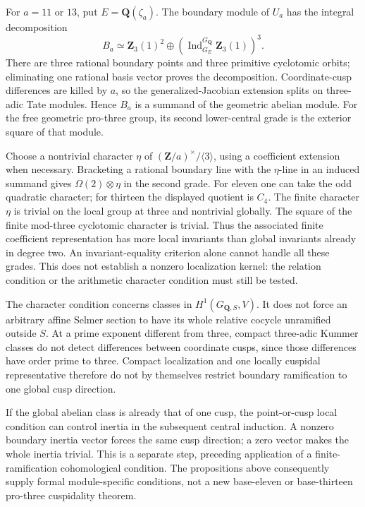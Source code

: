 \begin{remark}
\label{rem:boundary-finite-invariant-obstruction}
For \(a=11\) or \(13\), put \(E=\mathbf Q(\zeta_a)\).
The boundary module of \(U_a\) has the integral decomposition
\[
 B_a\simeq\mathbf Z_3(1)^2\oplus
     \left(\operatorname{Ind}_{G_E}^{G_{\mathbf Q}}
                       \mathbf Z_3(1)\right)^3.
\]
There are three rational boundary points and three primitive
cyclotomic orbits; eliminating one rational basis vector proves
the decomposition.
Coordinate-cusp differences are killed by \(a\), so the
generalized-Jacobian extension splits on three-adic Tate modules.
Hence \(B_a\) is a summand of the geometric abelian module.
For the free geometric pro-three group, its second lower-central
grade is the exterior square of that module.

Choose a nontrivial character \(\eta\) of
\((\mathbf Z/a)^\times/\langle3\rangle\), using a coefficient
extension when necessary. Bracketing a rational boundary line
with the \(\eta\)-line in an induced summand gives
\(\Omega(2)\otimes\eta\) in the second grade.
For eleven one can take the odd quadratic character; for thirteen
the displayed quotient is \(C_4\).
The finite character \(\eta\) is trivial on the local group at
three and nontrivial globally. The square of the finite
mod-three cyclotomic character is trivial.
Thus the associated finite coefficient representation has more
local invariants than global invariants already in degree two.
An invariant-equality criterion alone cannot handle all these
grades. This does not establish a nonzero localization kernel:
the relation condition or the arithmetic character condition
must still be tested.
\end{remark}

\begin{remark}
\label{rem:joint-localization-ramification-scope}
The character condition concerns classes in
\(H^1(G_{\mathbf Q,S},V)\). It does not force an arbitrary
affine Selmer section to have its whole relative cocycle
unramified outside \(S\).
At a prime exponent different from three, compact
three-adic Kummer classes do not detect differences between
coordinate cusps, since those differences have order prime to
three. Compact localization and one locally cuspidal
representative therefore do not by themselves restrict boundary
ramification to one global cusp direction.

If the global abelian class is already that of one cusp,
the point-or-cusp local condition can control inertia in the
subsequent central induction. A nonzero boundary inertia vector
forces the same cusp direction; a zero vector makes the whole
inertia trivial. This is a separate step, preceding application
of a finite-ramification cohomological condition.
The propositions above consequently supply formal
module-specific conditions, not a new base-eleven or
base-thirteen pro-three cuspidality theorem.
\end{remark}
